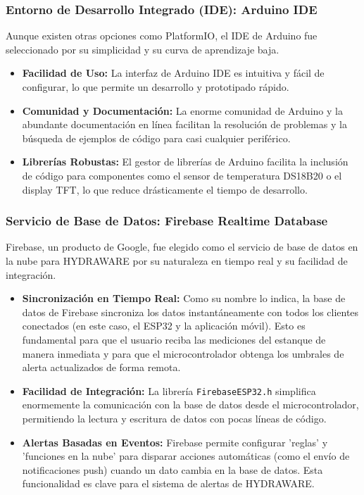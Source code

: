 \documentclass[a4paper,12pt]{article}
\begin{document}
	\subsubsection{Entorno de Desarrollo Integrado (IDE): Arduino IDE}
	Aunque existen otras opciones como PlatformIO, el IDE de Arduino fue seleccionado por su simplicidad y su curva de aprendizaje baja.
	\begin{itemize}
		\item \textbf{Facilidad de Uso:} La interfaz de Arduino IDE es intuitiva y fácil de configurar, lo que permite un desarrollo y prototipado rápido.
		\item \textbf{Comunidad y Documentación:} La enorme comunidad de Arduino y la abundante documentación en línea facilitan la resolución de problemas y la búsqueda de ejemplos de código para casi cualquier periférico.
		\item \textbf{Librerías Robustas:} El gestor de librerías de Arduino facilita la inclusión de código para componentes como el sensor de temperatura DS18B20 o el display TFT, lo que reduce drásticamente el tiempo de desarrollo.
	\end{itemize}
	
	\subsubsection{Servicio de Base de Datos: Firebase Realtime Database}
	Firebase, un producto de Google, fue elegido como el servicio de base de datos en la nube para HYDRAWARE por su naturaleza en tiempo real y su facilidad de integración.
	\begin{itemize}
		\item \textbf{Sincronización en Tiempo Real:} Como su nombre lo indica, la base de datos de Firebase sincroniza los datos instantáneamente con todos los clientes conectados (en este caso, el ESP32 y la aplicación móvil). Esto es fundamental para que el usuario reciba las mediciones del estanque de manera inmediata y para que el microcontrolador obtenga los umbrales de alerta actualizados de forma remota.
		\item \textbf{Facilidad de Integración:} La librería \texttt{FirebaseESP32.h} simplifica enormemente la comunicación con la base de datos desde el microcontrolador, permitiendo la lectura y escritura de datos con pocas líneas de código.
		\item \textbf{Alertas Basadas en Eventos:} Firebase permite configurar 'reglas' y 'funciones en la nube' para disparar acciones automáticas (como el envío de notificaciones push) cuando un dato cambia en la base de datos. Esta funcionalidad es clave para el sistema de alertas de HYDRAWARE.
	\end{itemize}
	
\end{document}
